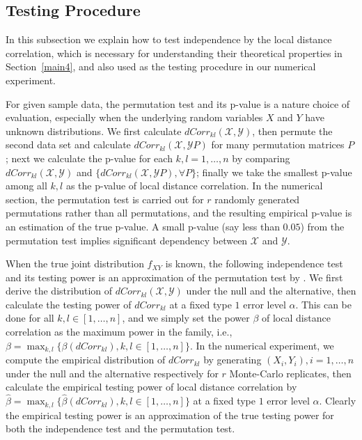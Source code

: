 \documentclass[12pt]{article}
\begin{document}
\subsection{Testing Procedure}
\label{main3}
In this subsection we explain how to test independence by the local distance correlation, which is necessary for understanding their theoretical properties in Section~\ref{main4}, and also used as the testing procedure in our numerical experiment.

For given sample data, the permutation test and its p-value is a nature choice of evaluation, especially when the underlying random variables $X$ and $Y$ have unknown distributions. We first calculate $dCorr_{kl}(\mathcal{X},\mathcal{Y})$, then permute the second data set and calculate $dCorr_{kl}(\mathcal{X},\mathcal{Y}P)$ for many permutation matrices $P$; next we calculate the p-value for each $k,l=1,\ldots,n$ by comparing $dCorr_{kl}(\mathcal{X},\mathcal{Y})$ and $\{dCorr_{kl}(\mathcal{X},\mathcal{Y}P), \forall P\}$; finally we take the smallest p-value among all $k,l$ as the p-value of local distance correlation. In the numerical section, the permutation test is carried out for $r$ randomly generated permutations rather than all permutations, and the resulting empirical p-value is an estimation of the true p-value. A small p-value (say less than $0.05$) from the permutation test implies significant dependency between $\mathcal{X}$ and $\mathcal{Y}$.

When the true joint distribution $f_{XY}$ is known, the following independence test and its testing power is an approximation of the permutation test by \cite{LehnmanRomanoStatBook}. We first derive the distribution of $dCorr_{kl}(\mathcal{X}, \mathcal{Y})$ under the null and the alternative, then calculate the testing power of $dCorr_{kl}$ at a fixed type $1$ error level $\alpha$. This can be done for all $k,l\in [1,\ldots,n]$, and we simply set the power $\beta$ of local distance correlation as the maximum power in the family, i.e., $\beta=\max_{k,l}\{\beta(dCorr_{kl}), k,l\in [1,\ldots,n]\}$. In the numerical experiment, we compute the empirical distribution of $dCorr_{kl}$ by generating $(X_{i},Y_{i}), i=1,\ldots,n$ under the null and the alternative respectively for $r$ Monte-Carlo replicates, then calculate the empirical testing power of local distance correlation by $\hat{\beta}=\max_{k,l}\{\hat{\beta}(dCorr_{kl}), k,l\in [1,\ldots,n]\}$ at a fixed type $1$ error level $\alpha$. Clearly the empirical testing power is an approximation of the true testing power for both the independence test and the permutation test. 
\end{document}
